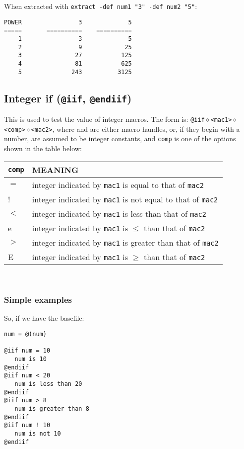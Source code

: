 \noindent
When extracted with {\tt extract -def num1 "3" -def num2 "5"}:
\begin{verbatim}
POWER                3             5
=====       ==========    ==========
    1                3             5
    2                9            25
    3               27           125
    4               81           625
    5              243          3125
\end{verbatim}

\subsection{Integer if ({\tt @iif}, {\tt @endiif})}
This is used to test the value of integer macros.  The form is:
{\tt @iif$\diamond$<mac1>$\diamond$<comp>$\diamond$<mac2>}, where
{\tt <mac1>} and {\tt <mac2>} are either macro handles, or, if they
begin with a number, are assumed to be integer constants,
and {\tt comp} is one of the options shown in the table below:\\
\begin{tabular}{|l|l|}\hline
{\tt comp} & MEANING\\\hline
$=$   & integer indicated by {\tt mac1} is equal to that of {\tt mac2}\\\hline
!     & integer indicated by {\tt mac1} is not equal to that of {\tt mac2}\\\hline
$<$ & integer indicated by {\tt mac1} is less than that of {\tt mac2}\\\hline
e   & integer indicated by {\tt mac1} is $\le$ than that of {\tt mac2}\\\hline
$>$ & integer indicated by {\tt mac1} is greater than that of {\tt mac2}\\\hline
E   & integer indicated by {\tt mac1} is $\ge$ than that of {\tt mac2}\\\hline
\end{tabular} \\

\subsubsection{Simple examples}
So, if we have the basefile:
\begin{verbatim}
num = @(num)

@iif num = 10
   num is 10
@endiif
@iif num < 20
   num is less than 20
@endiif
@iif num > 8
   num is greater than 8
@endiif
@iif num ! 10
   num is not 10
@endiif
\end{verbatim}

